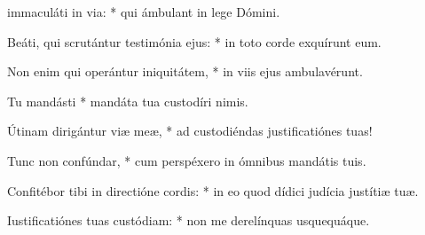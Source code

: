 \begin{psalmus}

 \hspace{.5em} immaculáti \hspace{.5em} in \hspace{.5em} via: * qui ámbulant in lege Dómini.

Beáti, qui scrutántur testimónia ejus: * in toto corde exquírunt eum.

Non enim qui operántur iniquitátem, * in viis ejus ambulavérunt.

Tu mandásti * mandáta tua custodíri nimis.

Útinam dirigántur viæ meæ, * ad custodiéndas justificatiónes tuas!

Tunc non confúndar, * cum perspéxero in ómnibus mandátis tuis.

Confitébor tibi in directióne cordis: * in eo quod dídici judícia justítiæ tuæ.

Iustificatiónes tuas custódiam: * non me derelínquas usquequáque.

\end{psalmus}
